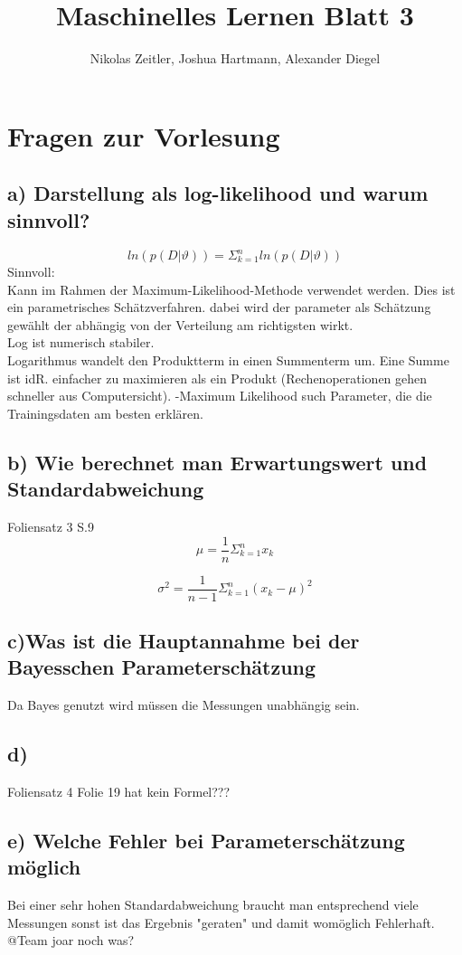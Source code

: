 \documentclass{scrartcl}
\author{Nikolas Zeitler, Joshua Hartmann, Alexander Diegel}
\title{Maschinelles Lernen Blatt 3}
\begin{document}
\maketitle
\section{Fragen zur Vorlesung}
\subsection*{a) Darstellung als log-likelihood und warum sinnvoll?}
\[ ln (p(D|\vartheta)) = \Sigma^n_{k=1} ln (p(D|\vartheta)) \]
Sinnvoll: \\
Kann im Rahmen der Maximum-Likelihood-Methode verwendet werden. Dies ist ein parametrisches Schätzverfahren. dabei wird der parameter als Schätzung gewählt der abhängig von der Verteilung am richtigsten wirkt.\\
Log ist numerisch stabiler.  \\
Logarithmus wandelt den Produktterm in einen Summenterm um. Eine Summe ist idR. einfacher zu maximieren 
als ein Produkt (Rechenoperationen gehen schneller aus Computersicht). -Maximum Likelihood such Parameter, die die Trainingsdaten am besten erklären.
\subsection*{b) Wie berechnet man Erwartungswert und Standardabweichung}
Foliensatz 3 S.9 \\
\[\mu = \frac{1}{n}\Sigma^n_{k=1}x_k \]

\[\sigma^2 = \frac{1}{n-1}\Sigma^n_{k=1}(x_k-\mu)^2 \]

\subsection*{c)Was ist die Hauptannahme bei der Bayesschen Parameterschätzung}
Da Bayes genutzt wird müssen die Messungen unabhängig sein. 
\subsection*{d)}
Foliensatz 4 Folie 19 hat kein Formel???

\subsection*{e) Welche Fehler bei Parameterschätzung möglich}
Bei einer sehr hohen Standardabweichung braucht man entsprechend viele Messungen sonst ist das Ergebnis "geraten" und damit womöglich Fehlerhaft.\\
@Team joar noch was?
\end{document}
